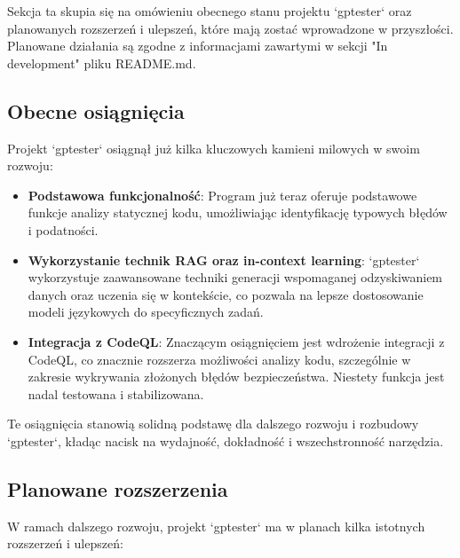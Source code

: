 Sekcja ta skupia się na omówieniu obecnego stanu projektu `gptester` oraz planowanych rozszerzeń i ulepszeń, które mają zostać wprowadzone w przyszłości. Planowane działania są zgodne z informacjami zawartymi w sekcji "In development" pliku README.md.

\subsection{Obecne osiągnięcia}
\label{subsec:obecne_osiagniecia}

Projekt `gptester` osiągnął już kilka kluczowych kamieni milowych w swoim rozwoju:

\begin{itemize}
    \item \textbf{Podstawowa funkcjonalność}: Program już teraz oferuje podstawowe funkcje analizy statycznej kodu, umożliwiając identyfikację typowych błędów i podatności.
    \item \textbf{Wykorzystanie technik RAG oraz in-context learning}: `gptester` wykorzystuje zaawansowane techniki generacji wspomaganej odzyskiwaniem danych oraz uczenia się w kontekście, co pozwala na lepsze dostosowanie modeli językowych do specyficznych zadań.
    \item \textbf{Integracja z CodeQL}: Znaczącym osiągnięciem jest wdrożenie integracji z CodeQL, co znacznie rozszerza możliwości analizy kodu, szczególnie w zakresie wykrywania złożonych błędów bezpieczeństwa. Niestety funkcja jest nadal testowana i stabilizowana.
\end{itemize}

Te osiągnięcia stanowią solidną podstawę dla dalszego rozwoju i rozbudowy `gptester`, kładąc nacisk na wydajność, dokładność i wszechstronność narzędzia.

\subsection{Planowane rozszerzenia}
\label{subsec:planowane_rozszerzenia}

W ramach dalszego rozwoju, projekt `gptester` ma w planach kilka istotnych rozszerzeń i ulepszeń:

